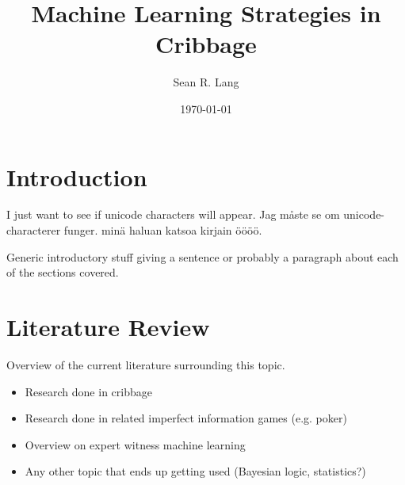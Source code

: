 \documentclass[english]{tktltiki}
\begin{document}

\title{Machine Learning Strategies in Cribbage}
\author{Sean R. Lang}
\date{\today}

\maketitle

\classification{\protect{\ \\
	}
}


\begin{abstract}

\end{abstract}


\section{Introduction}


I just want to see if unicode characters will appear.
Jag måste se om unicode-characterer funger.
minä haluan katsoa kirjain öööö.

Generic introductory stuff giving a sentence or probably a paragraph about
each of the sections covered.


\section{Literature Review}


Overview of the current literature surrounding this topic.

\begin{itemize}
	\item Research done in cribbage
	\item Research done in related imperfect information games (e.g. poker)
	\item Overview on expert witness machine learning
	\item Any other topic that ends up getting used (Bayesian logic, statistics?)
\end{itemize}
\end{document}
